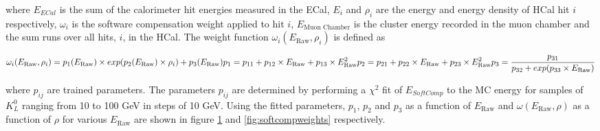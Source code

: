 where $E_{ECal}$ is the sum of the calorimeter hit energies measured in the ECal, $E_{i}$ and $\rho_{i}$ are the energy and energy density of HCal hit $i$ respectively, $\omega_{i}$ is the software compensation weight applied to hit $i$, $E_{\text{Muon Chamber}}$ is the cluster energy recorded in the muon chamber and the sum runs over all hits, $i$, in the HCal.  The weight function $\omega_{i}(E_{\text{Raw}}, \rho_{i})$ is defined as

\begin{equation}
\omega_{i}(E_{\text{Raw}}, \rho_{i}) = p_{1}(E_{\text{Raw}}) \times exp(p_{2}(E_{\text{Raw}}) \times \rho_{i}) + p_{3}(E_{\text{Raw}}) \\
p_{1} = p_{11} + p_{12} \times E_{\text{Raw}} + p_{13} \times E_{\text{Raw}}^{2} \\
p_{2} = p_{21} + p_{22} \times E_{\text{Raw}} + p_{23} \times E_{\text{Raw}}^{2} \\
p_{3} = \frac{p_{31}}{p_{32} + exp(p_{33} \times E_{\text{Raw}})}
\label{equ:softcompweight}
\end{equation}

where $p_{ij}$ are trained parameters.  The parameters $p_{ij}$ are determined by performing a $\chi^{2}$ fit of $E_{SoftComp}$ to the MC energy for samples of $K^{0}_{L}$ ranging from 10 to 100 GeV in steps of 10 GeV.  Using the fitted parameters, $p_{1}$,  $p_{2}$ and $p_{3}$ as a function of $E_{\text{Raw}}$ and $\omega(E_{\text{Raw}}, \rho)$ as a function of $\rho$ for various $E_{\text{Raw}}$ are shown in figure \ref{fig:softcompparams} and \ref{fig:softcompweights} respectively.  

\begin{figure}
\caption[]{}
\label{fig:softcompparams}
\end{figure}

